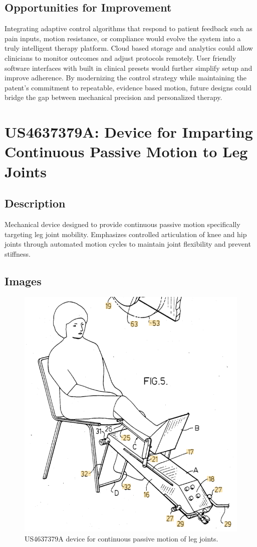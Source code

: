 \documentclass[11pt]{article}
\begin{document}
\subsection{Opportunities for Improvement}
Integrating adaptive control algorithms that respond to patient feedback such as pain inputs, motion resistance, or compliance would evolve the system into a truly intelligent therapy platform. Cloud based storage and analytics could allow clinicians to monitor outcomes and adjust protocols remotely. User friendly software interfaces with built in clinical presets would further simplify setup and improve adherence. By modernizing the control strategy while maintaining the patent's commitment to repeatable, evidence based motion, future designs could bridge the gap between mechanical precision and personalized therapy.

\section{US4637379A: Device for Imparting Continuous Passive Motion to Leg Joints}
\subsection{Description}
Mechanical device designed to provide continuous passive motion specifically targeting leg joint mobility. Emphasizes controlled articulation of knee and hip joints through automated motion cycles to maintain joint flexibility and prevent stiffness.
\subsection{Images}
\begin{figure}[H]
  \centering
  \includegraphics[width=0.54\linewidth]{US4637379A.png}
  \caption{US4637379A device for continuous passive motion of leg joints.}
  \label{fig:US4637379A}
\end{figure}
\end{document}
